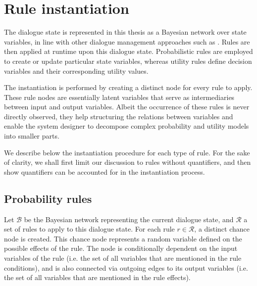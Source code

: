 
\section{Rule instantiation}
\label{sec:ruleinstantiation}

The dialogue state is represented in this thesis as a Bayesian network over state variables, in line with other dialogue management approaches such as \cite{Thomson:2010:BUD:1772996.1773040,bui2010}. Rules are then applied at runtime upon this dialogue state.  Probabilistic rules are employed to create or update particular state variables, whereas utility rules define decision variables and their corresponding utility values. 

The instantiation is performed by creating a distinct node for every rule to apply. These rule nodes are essentially latent variables that serve as intermediaries between input and output variables.  Albeit the occurrence of these rules is never directly observed, they help structuring the relations between variables and enable the system designer to decompose complex probability and utility models into smaller parts.   %

We describe below the instantiation procedure for each type of rule. For the sake of clarity, we shall first limit our discussion to rules without quantifiers, and then show quantifiers can be accounted for in the instantiation process. 

\subsection{Probability rules}
\label{sec:probruleinstantiation}

Let $\mathcal{B}$ be the Bayesian network representing the current dialogue state, and $\mathcal{R}$ a set of rules to apply to this dialogue state.  For each rule $r \in \mathcal{R}$, a distinct chance node is created.  This chance node represents a random variable defined on the possible effects of the rule.  The node is conditionally dependent on the input variables of the rule (i.e. the set of all variables that are mentioned in the rule conditions), and is also connected via outgoing edges to its output variables (i.e. the set of all variables that are mentioned in the rule effects). 

